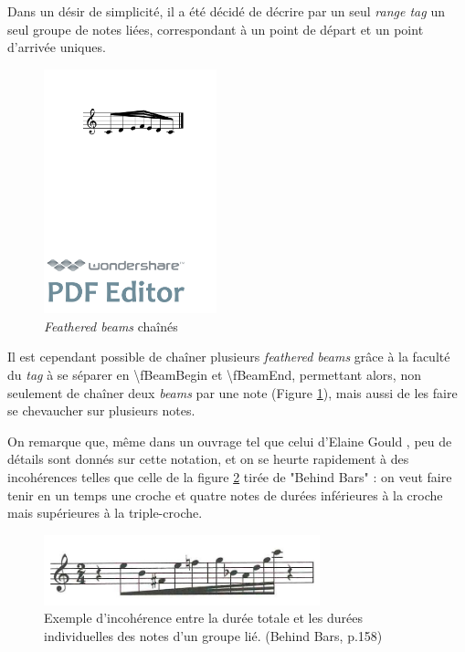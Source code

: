 \documentclass{article}
\newenvironment{gmncode}	{\vspace{-2mm}\small\verbatim}{\endverbatim\vspace{-2mm}}
\begin{document}
Dans un désir de simplicité, il a été décidé de décrire par un seul \emph{range tag} un seul groupe de notes liées, correspondant à un point de départ et un point d'arrivée uniques.

\begin{figure}[h]
\centering
\begin{gmncode}
[ 
  \fBeamBegin:1 
  c/8 d e/16 
  \fBeamBegin:2 f/32 \fBeamEnd:1 
  e/16 d/8 c
  \fBeamEnd:2 
]
\end{gmncode}
\includegraphics[width=5cm]{img/fBeamChaine.pdf}
\caption{\emph{Feathered beams} chaînés}
\label{fig:fbeamchain}
\end{figure}

Il est cependant possible de chaîner plusieurs \emph{feathered beams} grâce à la faculté du \emph{tag} à se séparer en \textbackslash{}fBeamBegin et \textbackslash{}fBeamEnd, permettant alors, non seulement de chaîner deux \emph{beams} par une note (Figure \ref{fig:fbeamchain}), mais aussi de les faire se chevaucher sur plusieurs notes.
\bigskip


On remarque que, même dans un ouvrage tel que celui d'Elaine Gould \cite{gould2011behind}, peu de détails sont donnés sur cette notation, et on se heurte rapidement à des incohérences telles que celle de la figure \ref{fig:incoherence} tirée de "Behind Bars" : on veut faire tenir en un temps une croche et quatre notes de durées inférieures à la croche mais supérieures à la triple-croche. 

\begin{figure}[h]
\centering
\includegraphics[width=8cm]{img/behindbars.jpg}
\caption{Exemple d'incohérence entre la durée totale et les durées individuelles des notes d'un groupe lié. (Behind Bars, p.158) }
\label{fig:incoherence}
\end{figure}
\end{document}
